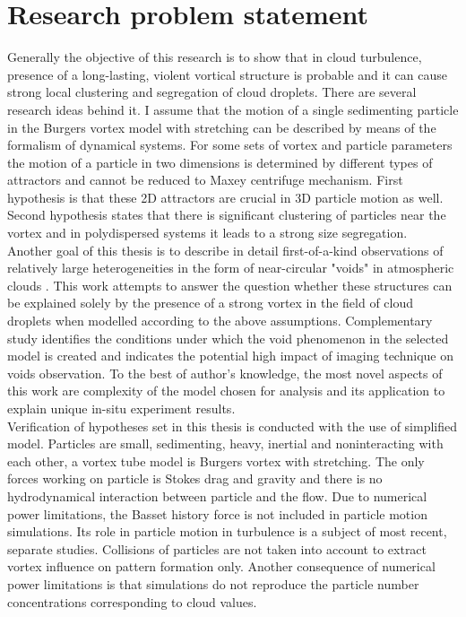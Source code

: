 \documentclass[../main.tex]{subfiles}
\begin{document}
\section{Research problem statement}
Generally the objective of this research is to show that in cloud turbulence, presence of a long-lasting, violent vortical structure is probable and it can cause strong local clustering and segregation of cloud droplets. There are several research ideas behind it.
I assume that the motion of a single sedimenting particle in the Burgers vortex model with stretching can be described by means of the formalism of dynamical systems. For some sets of vortex and particle parameters the motion of a particle in two dimensions is determined by different types of attractors and cannot be reduced to Maxey centrifuge mechanism. First hypothesis is that these 2D attractors are crucial in 3D particle motion as well. Second hypothesis states that there is significant clustering of particles near the vortex and in polydispersed systems it leads to a strong size segregation.\\
Another goal of this thesis is to describe in detail first-of-a-kind observations of relatively large heterogeneities in the form of near-circular "voids" in atmospheric clouds \citep{Xu2012}. This work attempts to answer the question whether these structures can be explained solely by the presence of a strong vortex in the field of cloud droplets when modelled according to the above assumptions. Complementary study identifies the conditions under which the void phenomenon in the selected model is created and indicates the potential high impact of imaging technique on voids observation. To the best of author's knowledge, the most novel aspects of this work are complexity of the model chosen for analysis and its application to explain unique in-situ experiment results.\\
Verification of hypotheses set in this thesis is conducted with the use of simplified model. Particles are small, sedimenting, heavy, inertial and noninteracting with each other, a vortex tube model is Burgers vortex with stretching. The only forces working on particle is Stokes drag and gravity and there is no hydrodynamical interaction between particle and the flow. Due to numerical power limitations, the Basset history force is not included in particle motion simulations. Its role in particle motion in turbulence is a subject of most recent, separate studies. Collisions of particles are not taken into account to extract vortex influence on pattern formation only. Another consequence of numerical power limitations is that simulations do not reproduce the particle number concentrations corresponding to cloud values.\\
\end{document}
